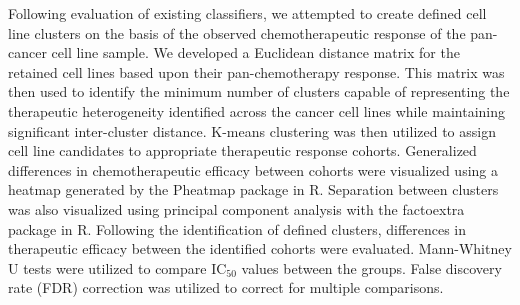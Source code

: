 \documentclass[10pt, letterpaper]{article}
\begin{document}
\begin{multicols*}{2}
Following evaluation of existing classifiers, we attempted to create defined cell line clusters on the basis of the observed chemotherapeutic response of the pan-cancer cell line sample. We developed a Euclidean distance matrix for the retained cell lines based upon their pan-chemotherapy response. This matrix was then used to identify the minimum number of clusters capable of representing the therapeutic heterogeneity identified across the cancer cell lines while maintaining significant inter-cluster distance. K-means clustering was then utilized to assign cell line candidates to appropriate therapeutic response cohorts. Generalized differences in chemotherapeutic efficacy between cohorts were visualized using a heatmap generated by the Pheatmap package in R. Separation between clusters was also visualized using principal component analysis with the factoextra package in R. Following the identification of defined clusters, differences in therapeutic efficacy between the identified cohorts were evaluated. Mann-Whitney U tests were utilized to compare IC$_{50}$ values between the groups. False discovery rate (FDR) correction was utilized to correct for multiple comparisons.



\end{multicols*}
\end{document}

